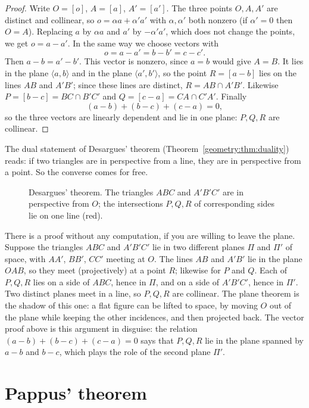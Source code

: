 \begin{proof}
Write $O=[o]$, $A=[a]$, $A'=[a']$. The three points $O,A,A'$ are distinct and collinear, so $o=\alpha a+\alpha'a'$ with $\alpha,\alpha'$ both
nonzero (if $\alpha'=0$ then $O=A$). Replacing $a$ by $\alpha a$ and $a'$ by $-\alpha'a'$, which does not change the points, we get $o=a-a'$. In
the same way we choose vectors with
\[
o=a-a'=b-b'=c-c'.
\]
Then $a-b=a'-b'$. This vector is nonzero, since $a=b$ would give $A=B$. It lies in the plane $\langle a,b\rangle$ and in the plane
$\langle a',b'\rangle$, so the point $R=[a-b]$ lies on the lines $AB$ and $A'B'$; since these lines are distinct, $R=AB\cap A'B'$. Likewise
$P=[b-c]=BC\cap B'C'$ and $Q=[c-a]=CA\cap C'A'$. Finally
\[
(a-b)+(b-c)+(c-a)=0,
\]
so the three vectors are linearly dependent and lie in one plane: $P,Q,R$ are collinear.
\end{proof}

The dual statement of Desargues' theorem (Theorem~\ref{geometry:thm:duality}) reads: if two triangles are in perspective from a line, they are in
perspective from a point. So the converse comes for free.

\begin{figure}[ht]
\centering
{}
\caption{Desargues' theorem. The triangles $ABC$ and $A'B'C'$ are in perspective from $O$; the intersections $P,Q,R$ of corresponding sides
lie on one line (red).}
\label{geometry:fig:desargues}
\end{figure}

\begin{beauty}
There is a proof without any computation, if you are willing to leave the plane. Suppose the triangles $ABC$ and $A'B'C'$ lie in two different
planes $\Pi$ and $\Pi'$ of space, with $AA'$, $BB'$, $CC'$ meeting at $O$. The lines $AB$ and $A'B'$ lie in the plane $OAB$, so they meet (projectively)
at a point $R$; likewise for $P$ and $Q$. Each of $P,Q,R$ lies on a side of $ABC$, hence in $\Pi$, and on a side of $A'B'C'$, hence in $\Pi'$. Two
distinct planes meet in a line, so $P,Q,R$ are collinear. The plane theorem is the shadow of this one: a flat figure can be lifted to space,
by moving $O$ out of the plane while keeping the other incidences, and then projected back. The vector proof above is this argument in
disguise: the relation $(a-b)+(b-c)+(c-a)=0$ says that $P,Q,R$ lie in the plane spanned by $a-b$ and $b-c$, which plays the role of the second
plane $\Pi'$.
\end{beauty}

\section{Pappus' theorem}

